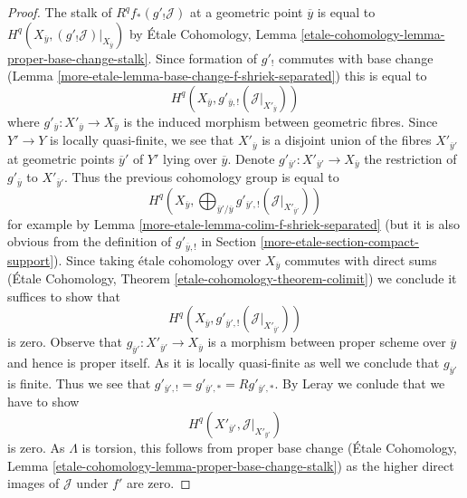 \begin{proof}
\medskip\noindent
The stalk of $R^qf_*(g'_!\mathcal{J})$ at a geometric point
$\overline{y}$ is equal to
$H^q(X_{\overline{y}}, (g'_!\mathcal{J})|_{X_{\overline{y}}})$ by
\'Etale Cohomology, Lemma
\ref{etale-cohomology-lemma-proper-base-change-stalk}.
Since formation of $g'_!$ commutes with base change
(Lemma \ref{more-etale-lemma-base-change-f-shriek-separated})
this is equal to
$$
H^q(X_{\overline{y}}, g'_{\overline{y}, !}(\mathcal{J}|_{X'_{\overline{y}}}))
$$
where $g'_{\overline{y}} : X'_{\overline{y}} \to X_{\overline{y}}$
is the induced morphism between geometric fibres.
Since $Y' \to Y$ is locally quasi-finite, we see that
$X'_{\overline{y}}$ is a disjoint union of the fibres
$X'_{\overline{y}'}$ at geometric points $\overline{y}'$ of $Y'$
lying over $\overline{y}$. Denote
$g'_{\overline{y}'} : X'_{\overline{y}'} \to X_{\overline{y}}$
the restriction of $g'_{\overline{y}}$ to $X'_{\overline{y}'}$.
Thus the previous cohomology group is equal to
$$
H^q(X_{\overline{y}},
\bigoplus\nolimits_{\overline{y}'/\overline{y}}
g'_{\overline{y}', !}(\mathcal{J}|_{X'_{\overline{y}'}}))
$$
for example by Lemma \ref{more-etale-lemma-colim-f-shriek-separated} (but it
is also obvious from the definition of $g'_{\overline{y}, !}$
in Section \ref{more-etale-section-compact-support}).
Since taking \'etale cohomology over $X_{\overline{y}}$
commutes with direct sums
(\'Etale Cohomology, Theorem \ref{etale-cohomology-theorem-colimit})
we conclude it suffices to show that
$$
H^q(X_{\overline{y}}, g'_{\overline{y}', !}(\mathcal{J}|_{X'_{\overline{y}'}}))
$$
is zero. Observe that
$g_{\overline{y}'} : X'_{\overline{y}'} \to X_{\overline{y}}$
is a morphism between proper scheme over $\overline{y}$ and hence is
proper itself. As it is locally quasi-finite as well we conclude that
$g_{\overline{y}'}$ is finite. Thus we see that
$g'_{\overline{y}', !} = g'_{\overline{y}', *} = Rg'_{\overline{y}', *}$.
By Leray we conlude that we have to show
$$
H^q(X'_{\overline{y}'}, \mathcal{J}|_{X'_{\overline{y}'}})
$$
is zero. As $\Lambda$ is torsion, this follows from proper base change
(\'Etale Cohomology, Lemma
\ref{etale-cohomology-lemma-proper-base-change-stalk})
as the higher direct images of $\mathcal{J}$ under $f'$ are zero.


\end{proof}
